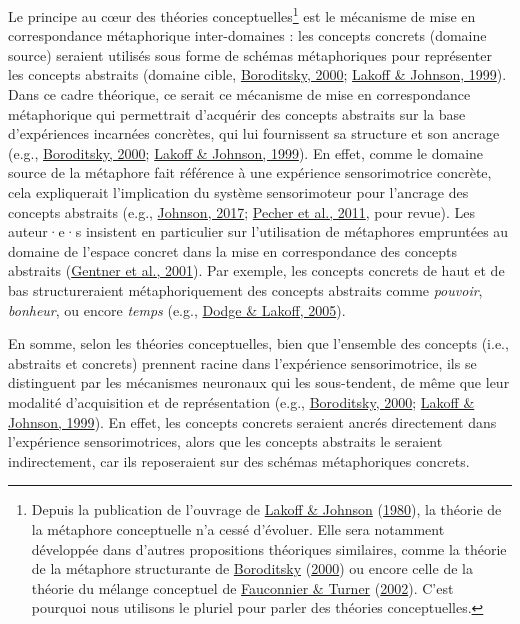 \documentclass[
  a4paper,12pt,twoside,onecolumn,openright,final,oldfontcommands]{memoir}
\begin{document}
Le principe au cœur des théories conceptuelles\footnote{Depuis la publication de l'ouvrage de \protect\hyperlink{ref-lakoff_metaphors_1980}{Lakoff \& Johnson} (\protect\hyperlink{ref-lakoff_metaphors_1980}{1980}), la théorie de la métaphore conceptuelle n'a cessé d'évoluer. Elle sera notamment développée dans d'autres propositions théoriques similaires, comme la théorie de la métaphore structurante de \protect\hyperlink{ref-boroditsky_metaphoric_2000}{Boroditsky} (\protect\hyperlink{ref-boroditsky_metaphoric_2000}{2000}) ou encore celle de la théorie du mélange conceptuel de \protect\hyperlink{ref-fauconnier_way_2002}{Fauconnier \& Turner} (\protect\hyperlink{ref-fauconnier_way_2002}{2002}). C'est pourquoi nous utilisons le pluriel pour parler des théories conceptuelles.} est le mécanisme de mise en correspondance métaphorique inter-domaines : les concepts concrets (domaine source) seraient utilisés sous forme de schémas métaphoriques pour représenter les concepts abstraits (domaine cible, \protect\hyperlink{ref-boroditsky_metaphoric_2000}{Boroditsky, 2000}; \protect\hyperlink{ref-lakoff_philosophy_1999}{Lakoff \& Johnson, 1999}). Dans ce cadre théorique, ce serait ce mécanisme de mise en correspondance métaphorique qui permettrait d'acquérir des concepts abstraits sur la base d'expériences incarnées concrètes, qui lui fournissent sa structure et son ancrage (e.g., \protect\hyperlink{ref-boroditsky_metaphoric_2000}{Boroditsky, 2000}; \protect\hyperlink{ref-lakoff_philosophy_1999}{Lakoff \& Johnson, 1999}). En effet, comme le domaine source de la métaphore fait référence à une expérience sensorimotrice concrète, cela expliquerait l'implication du système sensorimoteur pour l'ancrage des concepts abstraits (e.g., \protect\hyperlink{ref-johnson_embodied_2017}{Johnson, 2017}; \protect\hyperlink{ref-pecher_abstract_2011}{Pecher et al., 2011}, pour revue). Les auteur·e·s insistent en particulier sur l'utilisation de métaphores empruntées au domaine de l'espace concret dans la mise en correspondance des concepts abstraits (\protect\hyperlink{ref-gentner_metaphor_2001}{Gentner et al., 2001}). Par exemple, les concepts concrets de haut et de bas structureraient métaphoriquement des concepts abstraits comme \emph{pouvoir}, \emph{bonheur}, ou encore \emph{temps} (e.g., \protect\hyperlink{ref-geeraerts_image_2005}{Dodge \& Lakoff, 2005}).

En somme, selon les théories conceptuelles, bien que l'ensemble des concepts (i.e., abstraits et concrets) prennent racine dans l'expérience sensorimotrice, ils se distinguent par les mécanismes neuronaux qui les sous-tendent, de même que leur modalité d'acquisition et de représentation (e.g., \protect\hyperlink{ref-boroditsky_metaphoric_2000}{Boroditsky, 2000}; \protect\hyperlink{ref-lakoff_philosophy_1999}{Lakoff \& Johnson, 1999}). En effet, les concepts concrets seraient ancrés directement dans l'expérience sensorimotrices, alors que les concepts abstraits le seraient indirectement, car ils reposeraient sur des schémas métaphoriques concrets.
\end{document}
